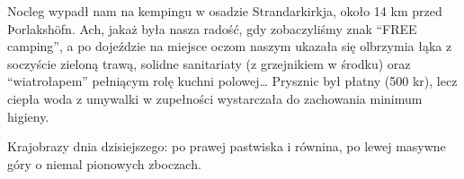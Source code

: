 
Nocleg wypadł nam na kempingu w osadzie Strandarkirkja, około 14 km przed Þorlakshöfn. Ach, jakaż była nasza radość, gdy zobaczyliśmy znak “FREE camping”, a po dojeździe na miejsce oczom naszym ukazała się olbrzymia łąka z soczyście zieloną trawą, solidne sanitariaty (z grzejnikiem w środku) oraz “wiatrołapem” pełniącym rolę kuchni polowej… Prysznic był płatny (500 kr), lecz ciepła woda z umywalki w zupełności wystarczała do zachowania minimum higieny.

Krajobrazy dnia dzisiejszego: po prawej pastwiska i równina, po lewej masywne góry o niemal pionowych zboczach.

